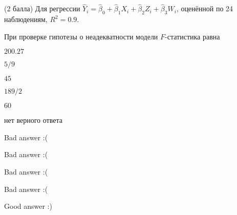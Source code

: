 
\begin{question}
(2 балла) Для регрессии
\(\hat Y_i = \hat\beta_0 + \hat\beta_1 X_i + \hat\beta_2 Z_i + \hat\beta_3 W_i\),
оценённой по 24 наблюдениям, \(R^2=0.9\).

При проверке гипотезы о неадекватности модели \(F\)-статистика равна
\begin{answerlist}
  \item \(200.27\)
  \item \(5/9\)
  \item \(45\)
  \item \(189/2\)
  \item \(60\)
  \item нет верного ответа
\end{answerlist}
\end{question}

\begin{solution}
\begin{answerlist}
  \item Bad answer :(
  \item Bad answer :(
  \item Bad answer :(
  \item Bad answer :(
  \item Good answer :)
\end{answerlist}
\end{solution}
